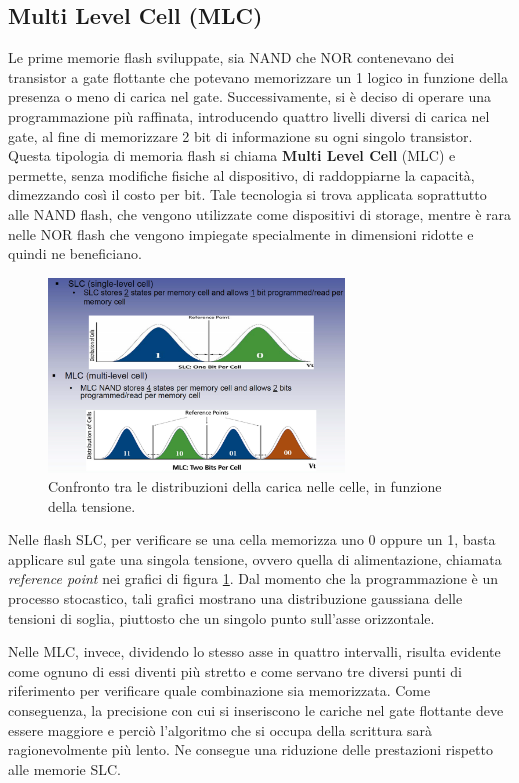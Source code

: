 \documentclass[11pt,4paper]{report}
\begin{document}
\subsection{Multi Level Cell (MLC)}
Le prime memorie flash sviluppate, sia NAND che NOR contenevano dei transistor a gate flottante che potevano memorizzare un 1 logico in funzione della presenza o meno di carica nel gate. Successivamente, si è deciso di operare una programmazione più raffinata, introducendo quattro livelli diversi di carica nel gate, al fine di memorizzare 2 bit di informazione su ogni singolo transistor. Questa tipologia di memoria flash si chiama \textbf{Multi Level Cell} (MLC) e permette, senza modifiche fisiche al dispositivo, di raddoppiarne la capacità, dimezzando così il costo per bit. Tale tecnologia si trova applicata soprattutto alle NAND flash, che vengono utilizzate come dispositivi di storage, mentre è rara nelle NOR flash che vengono impiegate specialmente in dimensioni ridotte e quindi ne beneficiano.

\begin{figure}[hbtp]
	\centering
	\includegraphics[width=0.7\textwidth]{memorie/jc_slc_mlc_gauss}
	\caption{Confronto tra le distribuzioni della carica nelle celle, in funzione della tensione.}
	\label{fig:jc_slc_mlc_gauss}
\end{figure}

Nelle flash SLC, per verificare se una cella memorizza uno 0 oppure un 1, basta applicare sul gate una singola tensione, ovvero quella di alimentazione, chiamata \emph{reference point} nei grafici di figura \ref{fig:jc_slc_mlc_gauss}. Dal momento che la programmazione è un processo stocastico, tali grafici mostrano una distribuzione gaussiana delle tensioni di soglia, piuttosto che un singolo punto sull'asse orizzontale.

Nelle MLC, invece, dividendo lo stesso asse in quattro intervalli, risulta evidente come ognuno di essi diventi più stretto e come servano tre diversi punti di riferimento per verificare quale combinazione sia memorizzata. Come conseguenza, la precisione con cui si inseriscono le cariche nel gate flottante deve essere maggiore e perciò l'algoritmo che si occupa della scrittura sarà ragionevolmente più lento. Ne consegue una riduzione delle prestazioni rispetto alle memorie SLC.
\end{document}
